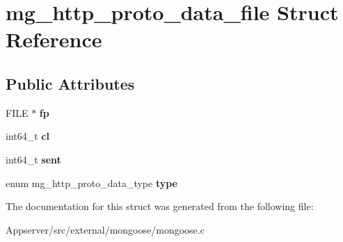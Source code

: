 \hypertarget{structmg__http__proto__data__file}{}\section{mg\+\_\+http\+\_\+proto\+\_\+data\+\_\+file Struct Reference}
\label{structmg__http__proto__data__file}
\subsection*{Public Attributes}
\begin{DoxyCompactItemize}
\item 
F\+I\+LE $\ast$ {\bfseries fp}\hypertarget{structmg__http__proto__data__file_a3c2842046c2608a6c0c3019516b6f5a4}{}\label{structmg__http__proto__data__file_a3c2842046c2608a6c0c3019516b6f5a4}

\item 
int64\+\_\+t {\bfseries cl}\hypertarget{structmg__http__proto__data__file_a68d6d737e984334010c34a2ec49786c2}{}\label{structmg__http__proto__data__file_a68d6d737e984334010c34a2ec49786c2}

\item 
int64\+\_\+t {\bfseries sent}\hypertarget{structmg__http__proto__data__file_a7e291f2aa92c71cde4120c3e08fc5705}{}\label{structmg__http__proto__data__file_a7e291f2aa92c71cde4120c3e08fc5705}

\item 
enum mg\+\_\+http\+\_\+proto\+\_\+data\+\_\+type {\bfseries type}\hypertarget{structmg__http__proto__data__file_a85da9b61dc998cbf4be7e276fb96d164}{}\label{structmg__http__proto__data__file_a85da9b61dc998cbf4be7e276fb96d164}

\end{DoxyCompactItemize}


The documentation for this struct was generated from the following file\+:\begin{DoxyCompactItemize}
\item 
Appserver/src/external/mongoose/mongoose.\+c\end{DoxyCompactItemize}

